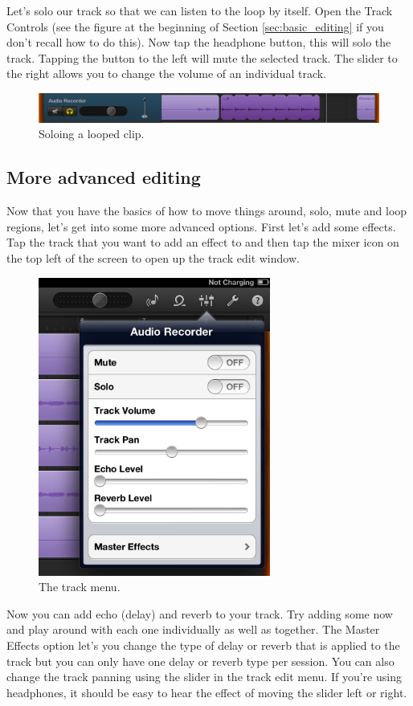 \documentclass[12pt]{article}
\begin{document}
Let's solo our track so that we can listen to the loop by itself. Open the Track Controls (see the figure at the beginning of Section \ref{sec:basic_editing} if you don't recall how to do this). Now tap the headphone button, this will solo the track. Tapping the button to the left will mute the selected track. The slider to the right allows you to change the volume of an individual track. 
\begin{figure}[h]
   \centering
   \includegraphics[width=6in]{fig/step5.png}  
   \caption*{Soloing a looped clip.}
\end{figure}

\subsection{More advanced editing}
Now that you have the basics of how to move things around, solo, mute and loop regions, let's get into some more advanced options. First let's add some effects. Tap the track that you want to add an effect to and then tap the mixer icon on the top left of the screen to open up the track edit window.
\begin{figure}[h]
   \centering
   \includegraphics[width=3in]{fig/step6.png}
   \caption*{The track menu.}
\end{figure}

Now you can add echo (delay) and reverb to your track. Try adding some now and play around with each one individually as well as together. The Master Effects option let's you change the type of delay or reverb that is applied to the track but you can only have one delay or reverb type per session. You can also change the track panning using the slider in the track edit menu. If you're using headphones, it should be easy to hear the effect of moving the slider left or right.
\end{document}
